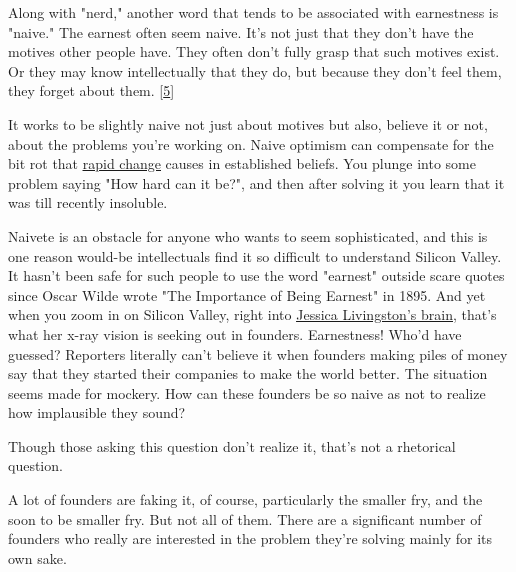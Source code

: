 Along
                  with "nerd," another word that tends to be associated with
                  earnestness is "naive." The earnest often seem naive. It's not
                  just that they don't have the motives other people have. They
                  often don't fully grasp that such motives exist. Or they may
                  know intellectually that they do, but because they don't feel
                  them, they forget about them.
                  [\href{\#f5n}{5}]

It works to be slightly naive not just about
                  motives but also, believe it or not, about the problems you're
                  working on. Naive optimism can compensate for the bit rot that
                  \href{http://www.paulgraham.com/ecw.html}{\underline{rapid change}} causes in
                  established beliefs. You plunge into some problem saying "How
                  hard can it be?", and then after solving it you learn that it
                  was till recently insoluble.

Naivete is an obstacle
                  for anyone who wants to seem sophisticated, and this is one
                  reason would-be intellectuals find it so difficult to
                  understand Silicon Valley. It hasn't been safe for such people
                  to use the word "earnest" outside scare quotes since Oscar
                  Wilde wrote "The Importance of Being Earnest" in 1895. And yet
                  when you zoom in on Silicon Valley, right into
                  \href{http://www.paulgraham.com/jessica.html}{\underline{Jessica Livingston's brain}}, that's what her x-ray vision is seeking out in founders.
                  Earnestness! Who'd have guessed? Reporters literally can't
                  believe it when founders making piles of money say that they
                  started their companies to make the world better. The
                  situation seems made for mockery. How can these founders be so
                  naive as not to realize how implausible they sound?

Though
                  those asking this question don't realize it, that's not a
                  rhetorical question.

A lot of founders are faking
                  it, of course, particularly the smaller fry, and the soon to
                  be smaller fry. But not all of them. There are a significant
                  number of founders who really are interested in the problem
                  they're solving mainly for its own sake.

